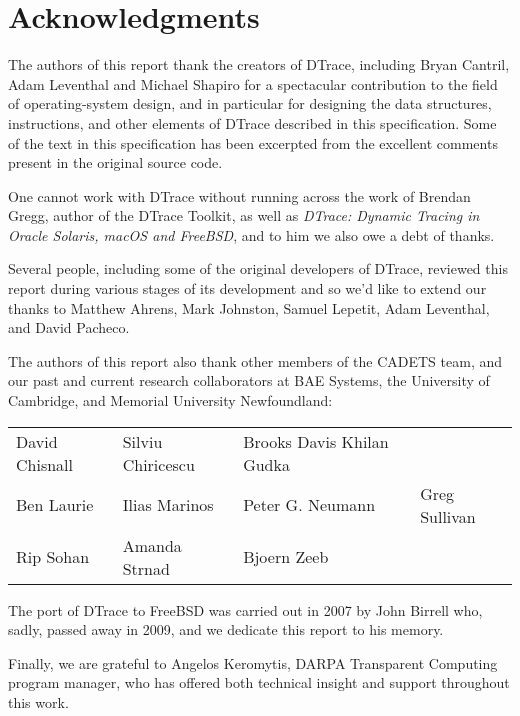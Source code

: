 \section*{Acknowledgments}
The authors of this report thank the creators of DTrace, including
Bryan Cantril, Adam Leventhal and Michael Shapiro for a spectacular
contribution to the field of operating-system design, and in
particular for designing the data structures, instructions, and other
elements of DTrace described in this specification.  Some of the text
in this specification has been excerpted from the excellent comments
present in the original source code.

One cannot work with DTrace without running across the work of Brendan
Gregg, author of the DTrace Toolkit, as well as \emph{DTrace: Dynamic
  Tracing in Oracle Solaris, macOS and FreeBSD}, and to him we also
owe a debt of thanks.

Several people, including some of the original developers of DTrace,
reviewed this report during various stages of its development and so
we'd like to extend our thanks to Matthew Ahrens, Mark Johnston,
Samuel Lepetit, Adam Leventhal, and David Pacheco.

The authors of this report also thank other members of the CADETS team, and
our past and current research collaborators at BAE Systems, the University of
Cambridge, and Memorial University Newfoundland:

%
%
\begin{tabular}{llll}
  David Chisnall & Silviu Chiricescu & Brooks Davis Khilan Gudka \\
  Ben Laurie & Ilias Marinos & Peter G. Neumann & Greg Sullivan \\
  Rip Sohan & Amanda Strnad & Bjoern Zeeb
\end{tabular}

\bigskip

%
%
%

The port of DTrace to FreeBSD was carried out in 2007 by John Birrell
who, sadly, passed away in 2009, and we dedicate this report to his
memory.

\noindent
Finally, we are grateful to Angelos Keromytis, DARPA Transparent Computing
program manager, who has offered both technical insight and support throughout
this work.
